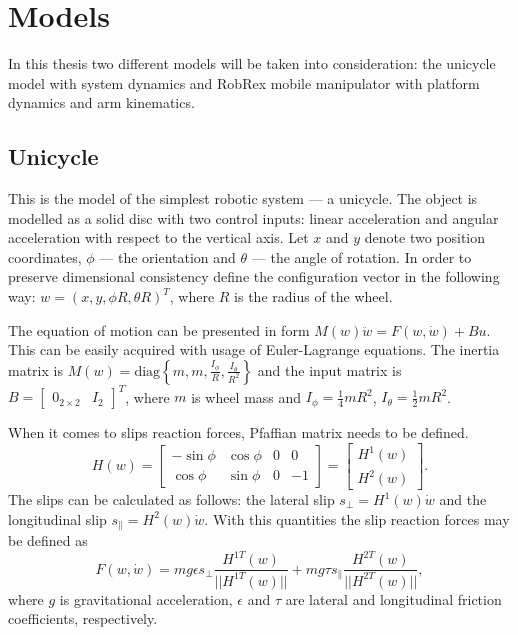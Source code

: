 \chapter{Models}
\label{ch:model}
In this thesis two different models will be taken into consideration: the unicycle model with system dynamics and RobRex mobile manipulator with platform dynamics and arm kinematics.
\section{Unicycle}
This is the model of the simplest robotic system --- a unicycle.
The object is modelled as a solid disc with two control inputs:
linear acceleration and angular acceleration with respect to the vertical axis.
Let $x$ and $y$ denote two position coordinates, $\phi$ --- the orientation
and $\theta$ --- the angle of rotation. 
In order to preserve dimensional consistency define the configuration vector in the following way:
$w = (x, y, \phi R, \theta R)^T$, where $R$ is the radius of the wheel.

The equation of motion can be presented
in form $M(w)\ddot w =F(w, \dot w)+Bu$. This can be easily acquired with usage of Euler-Lagrange equations. The inertia matrix is $M(w)=\mathrm{diag}\left\{m, m, \frac{I_\phi}{R}, \frac{I_\theta}{R^2}\right\}$ and the input matrix is $B=\begin{bmatrix}
0_{2 \times 2} & I_2
\end{bmatrix}^T$, where $m$ is wheel mass and $I_\phi=\frac{1}{4}mR^2$, $I_\theta=\frac{1}{2}mR^2$.

When it comes to slips reaction forces, Pfaffian matrix needs to be defined.
\begin{equation}
H(w)=\begin{bmatrix}
-\sin\phi & \cos\phi & 0 & 0\\
\cos\phi & \sin\phi & 0 & -1
\end{bmatrix}=\begin{bmatrix}
H^1(w)\\
H^2(w)
\end{bmatrix}.
\end{equation}
The slips can be calculated as follows: the lateral slip $s_\perp=H^1(w)\dot w$ and the longitudinal slip $s_\parallel=H^2(w)\dot w$. With this quantities the slip reaction forces may be defined as 
\begin{equation}
F(w, \dot w)=mg\epsilon s_\perp\frac{H^{1T}(w)}{||H^{1T}(w)||} + mg\tau s_\parallel\frac{H^{2T}(w)}{||H^{2T}(w)||},
\end{equation}
where $g$ is gravitational acceleration, $\epsilon$ and $\tau$ are lateral and longitudinal friction coefficients, respectively.


